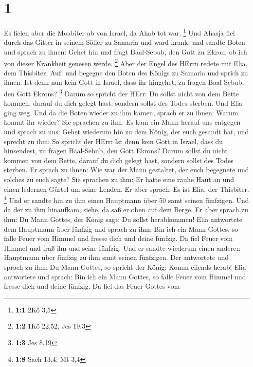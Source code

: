 \hypertarget{section}{%
\section{1}\label{section}}

 Es fielen aber die Moabiter ab von Israel, da Ahab tot war.
\footnote{\textbf{1:1} 2Kö 3,5}  Und Ahasja fiel durch das
Gitter in seinem Söller zu Samaria und ward krank; und sandte Boten und
sprach zu ihnen: Gehet hin und fragt Baal-Sebub, den Gott zu Ekron, ob
ich von dieser Krankheit genesen werde. \footnote{\textbf{1:2} 1Kö
  22,52; Jes 19,3}  Aber der Engel des HErrn redete mit
Elia, dem Thisbiter: Auf! und begegne den Boten des Königs zu Samaria
und sprich zu ihnen: Ist denn nun kein Gott in Israel, dass ihr
hingehet, zu fragen Baal-Sebub, den Gott Ekrons? \footnote{\textbf{1:3}
  Jes 8,19}  Darum so spricht der HErr: Du sollst nicht von
dem Bette kommen, darauf du dich gelegt hast, sondern sollst des Todes
sterben. Und Elia ging weg.  Und da die Boten wieder zu ihm
kamen, sprach er zu ihnen: Warum kommt ihr wieder?  Sie
sprachen zu ihm: Es kam ein Mann herauf uns entgegen und sprach zu uns:
Gehet wiederum hin zu dem König, der euch gesandt hat, und sprecht zu
ihm: So spricht der HErr: Ist denn kein Gott in Israel, dass du
hinsendest, zu fragen Baal-Sebub, den Gott Ekrons? Darum sollst du nicht
kommen von dem Bette, darauf du dich gelegt hast, sondern sollst des
Todes sterben.  Er sprach zu ihnen: Wie war der Mann
gestaltet, der euch begegnete und solches zu euch sagte? 
Sie sprachen zu ihm: Er hatte eine rauhe Haut an und einen ledernen
Gürtel um seine Lenden. Er aber sprach: Es ist Elia, der Thisbiter.
\footnote{\textbf{1:8} Sach 13,4; Mt 3,4}  Und er sandte hin
zu ihm einen Hauptmann über 50 samt seinen fünfzigen. Und da der zu ihm
hinaufkam, siehe, da saß er oben auf dem Berge. Er aber sprach zu ihm:
Du Mann Gottes, der König sagt: Du sollst herabkommen! 
Elia antwortete dem Hauptmann über fünfzig und sprach zu ihm: Bin ich
ein Mann Gottes, so falle Feuer vom Himmel und fresse dich und deine
fünfzig. Da fiel Feuer vom Himmel und fraß ihn und seine fünfzig.
 Und er sandte wiederum einen anderen Hauptmann über
fünfzig zu ihm samt seinen fünfzigen. Der antwortete und sprach zu ihm:
Du Mann Gottes, so spricht der König: Komm eilends herab! 
Elia antwortete und sprach: Bin ich ein Mann Gottes, so falle Feuer vom
Himmel und fresse dich und deine fünfzig. Da fiel das Feuer Gottes vom
